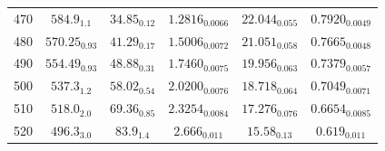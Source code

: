 \documentclass[journal=jctc,manuscript=article]{achemso}
\begin{document}
\begin{table}[htb!]
\begin{center}
\begin{tabular}{|c|c|c|c|c|c|}
				470 & $584.9_{1.1}$ & $34.85_{0.12}$ & $1.2816_{0.0066}$ & $22.044_{0.055}$ & $0.7920_{0.0049}$ \\
				480 & $570.25_{0.93}$ & $41.29_{0.17}$ & $1.5006_{0.0072}$ & $21.051_{0.058}$ & $0.7665_{0.0048}$ \\
				490 & $554.49_{0.93}$ & $48.88_{0.31}$ & $1.7460_{0.0075}$ & $19.956_{0.063}$ & $0.7379_{0.0057}$ \\
				500 & $537.3_{1.2}$ & $58.02_{0.54}$ & $2.0200_{0.0076}$ & $18.718_{0.064}$ & $0.7049_{0.0071}$ \\
				510 & $518.0_{2.0}$ & $69.36_{0.85}$ & $2.3254_{0.0084}$ & $17.276_{0.076}$ & $0.6654_{0.0085}$ \\
				520 & $496.3_{3.0}$ & $83.9_{1.4}$ & $2.666_{0.011}$ & $15.58_{0.13}$ & $0.619_{0.011}$ \\
				\hline
			\end{tabular}
		\end{center}
	\end{table}
\end{document}
